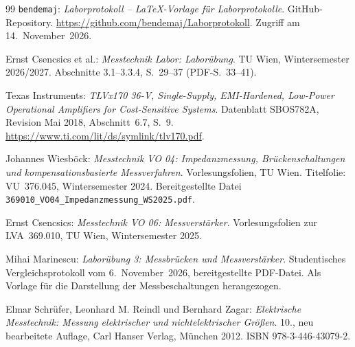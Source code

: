 \documentclass[11pt,a4paper]{scrartcl}
\begin{document}
\clearpage
\renewcommand{\refname}{Literaturverzeichnis}
\begin{thebibliography}{99}
  \texttt{bendemaj}: \emph{Laborprotokoll -- LaTeX-Vorlage für Laborprotokolle}.
  GitHub-Repository.
  \url{https://github.com/bendemaj/Laborprotokoll}.
  Zugriff am 14.~November~2026.

  Ernst Csencsics et al.: \emph{Messtechnik Labor: Laborübung}. TU Wien, Wintersemester 2026/2027.
  Abschnitte 3.1--3.3.4, S.~29--37 (PDF-S.~33--41).

  Texas Instruments: \emph{TLVx170 36-V, Single-Supply, EMI-Hardened, Low-Power Operational Amplifiers for Cost-Sensitive Systems}.
  Datenblatt SBOS782A, Revision Mai 2018, Abschnitt~6.7, S.~9.
  \url{https://www.ti.com/lit/ds/symlink/tlv170.pdf}.

  Johannes Wiesböck: \emph{Messtechnik VO 04: Impedanzmessung, Brückenschaltungen und kompensationsbasierte Messverfahren}.
  Vorlesungsfolien, TU Wien. Titelfolie: VU~376.045, Wintersemester 2024. Bereitgestellte Datei
  \texttt{369010\_VO04\_Impedanzmessung\_WS2025.pdf}.

  Ernst Csencsics: \emph{Messtechnik VO 06: Messverstärker}.
  Vorlesungsfolien zur LVA~369.010, TU Wien, Wintersemester 2025.

  Mihai Marinescu: \emph{Laborübung 3: Messbrücken und Messverstärker}.
  Studentisches Vergleichsprotokoll vom 6.~November~2026, bereitgestellte PDF-Datei.
  Als Vorlage für die Darstellung der Messbeschaltungen herangezogen.

  Elmar Schrüfer, Leonhard M. Reindl und Bernhard Zagar:
  \emph{Elektrische Messtechnik: Messung elektrischer und nichtelektrischer Größen}.
  10., neu bearbeitete Auflage, Carl Hanser Verlag, München 2012. ISBN 978-3-446-43079-2.
\end{thebibliography}
\end{document}
